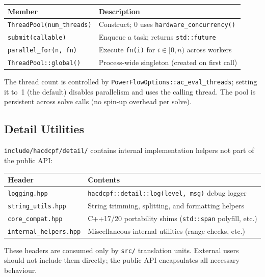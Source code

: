\begin{center}
\begin{tabular}{ll}
\hline\hline
\textbf{Member} & \textbf{Description} \\
\hline
\texttt{ThreadPool(num\_threads)} & Construct; 0 uses \texttt{hardware\_concurrency()} \\
\texttt{submit(callable)} & Enqueue a task; returns \texttt{std::future} \\
\texttt{parallel\_for(n, fn)} & Execute \texttt{fn(i)} for $i \in [0, n)$ across workers \\
\texttt{ThreadPool::global()} & Process-wide singleton (created on first call) \\
\hline\hline
\end{tabular}
\end{center}

The thread count is controlled by \texttt{PowerFlowOptions::ac\_eval\_threads};
setting it to~1 (the default) disables parallelism and uses the calling thread.
The pool is persistent across solve calls (no spin-up overhead per solve).

\subsection{Detail Utilities}
\label{sec:detail}

\texttt{include/hacdcpf/detail/} contains internal implementation helpers not
part of the public API:

\begin{center}
\begin{tabular}{ll}
\hline\hline
\textbf{Header} & \textbf{Contents} \\
\hline
\texttt{logging.hpp} & \texttt{hacdcpf::detail::log(level, msg)} debug logger \\
\texttt{string\_utils.hpp} & String trimming, splitting, and formatting helpers \\
\texttt{core\_compat.hpp} & C++17/20 portability shims (\texttt{std::span} polyfill, etc.) \\
\texttt{internal\_helpers.hpp} & Miscellaneous internal utilities (range checks, etc.) \\
\hline\hline
\end{tabular}
\end{center}

These headers are consumed only by \texttt{src/} translation units.  External
users should not include them directly; the public API encapsulates all
necessary behaviour.
